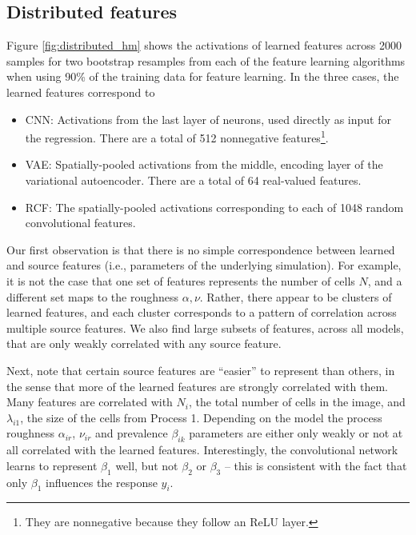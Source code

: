 \subsection{Distributed features}

Figure \ref{fig:distributed_hm} shows the activations of learned features across
2000 samples for two bootstrap resamples from each of the feature learning
algorithms when using 90\% of the training data for feature learning. In the
three cases, the learned features correspond to

\begin{itemize}
\item CNN: Activations from the last layer of neurons, used directly as input
  for the regression. There are a total of 512 nonnegative
  features\footnote{They are nonnegative because they follow an ReLU layer.}.
\item VAE: Spatially-pooled activations from the middle, encoding layer of the
  variational autoencoder. There are a total of 64 real-valued features.
\item RCF: The spatially-pooled activations corresponding to each of 1048 random
  convolutional features.
\end{itemize}

Our first observation is that there is no simple correspondence between learned
and source features (i.e., parameters of the underlying simulation). For
example, it is not the case that one set of features represents the number of
cells $N$, and a different set maps to the roughness $\alpha, \nu$. Rather,
there appear to be clusters of learned features, and each cluster corresponds to
a pattern of correlation across multiple source features. We also find large
subsets of features, across all models, that are only weakly correlated with any
source feature.

Next, note that certain source features are ``easier'' to represent than others,
in the sense that more of the learned features are strongly correlated with
them. Many features are correlated with $N_{i}$, the total number of cells in
the image, and $\lambda_{i1}$, the size of the cells from Process 1. Depending
on the model the process roughness $\alpha_{ir}$, $\nu_{ir}$ and prevalence
$\beta_{ik}$ parameters are either only weakly or not at all correlated with the
learned features. Interestingly, the convolutional network learns to represent
$\beta_{1}$ well, but not $\beta_{2}$ or $\beta_{3}$ -- this is consistent with
the fact that only $\beta_{1}$ influences the response $y_{i}$.

